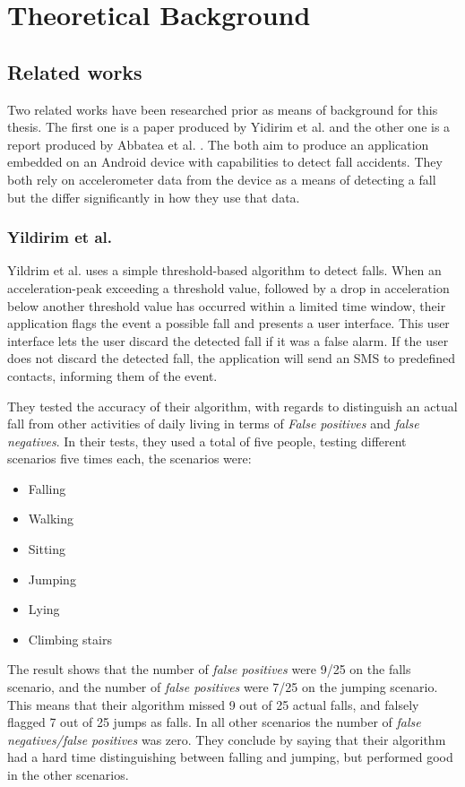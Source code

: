 \documentclass[12pt, a4paper, onecolumn]{article}
\begin{document}
\section{Theoretical Background}
	\subsection{Related works} Two related works have been researched prior as means of background for this thesis. The first one is a paper produced by Yidirim et al. \cite{int_journ} and the other one is a report produced by Abbatea et al. \cite{piza_uni}. The both aim to produce an application embedded on an Android device with capabilities to detect fall accidents. They both rely on accelerometer data from the device as a means of detecting a fall but the differ significantly in how they use that data. 
	
	\subsubsection{Yildirim et al.}
	Yildrim et al. \cite{int_journ} uses a simple threshold-based algorithm to detect falls. When an acceleration-peak exceeding a threshold value, followed by a drop in acceleration below another threshold value has occurred within a limited time window, their application flags the event a possible fall and presents a user interface. This user interface lets the user discard the detected fall if it was a false alarm. If the user does not discard the detected fall, the application will send an SMS to predefined contacts, informing them of the event. 
	
	They tested the accuracy of their algorithm, with regards to distinguish an actual fall from other activities of daily living in terms of \textit{False positives} and \textit{false negatives}. In their tests, they used a total of five people, testing different scenarios five times each, the scenarios were:
	
		\begin{itemize}
			\item Falling
			\item Walking
			\item Sitting
			\item Jumping
			\item Lying
			\item Climbing stairs
		\end{itemize}
	
	The result shows that the number of \textit{false positives} were 9/25 on the falls scenario, and the number of \textit{false positives} were 7/25 on the jumping scenario. This means that their algorithm missed 9 out of 25 actual falls, and falsely flagged 7 out of 25 jumps as falls. In all other scenarios the number of \textit{false negatives/false positives} was zero. They conclude by saying that their algorithm had a hard time distinguishing between falling and jumping, but performed good in the other scenarios. 
	
\end{document}
